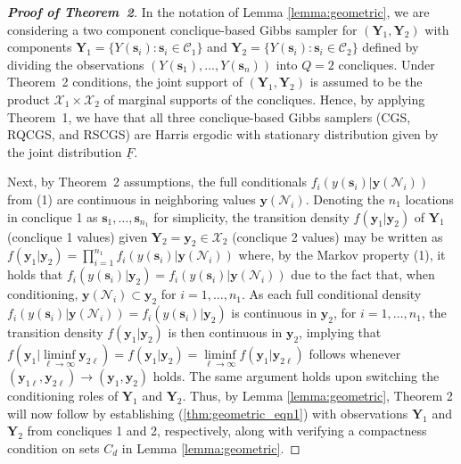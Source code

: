 \documentclass[12pt]{article}
\theoremstyle{definition}
\begin{document}
\begin{proof}[\bf Proof of Theorem~2]
  In the notation of Lemma \ref{lemma:geometric}, we are considering a two component conclique-based Gibbs sampler for $(\boldsymbol Y_1, \boldsymbol Y_2)$ with components $\boldsymbol Y_1 =\{Y(\boldsymbol s_i):\boldsymbol s_i \in \mathcal{C}_1\}$ and $\boldsymbol Y_2 =\{Y(\boldsymbol s_i):\boldsymbol s_i \in \mathcal{C}_2\}$ defined by dividing the observations $(Y(\boldsymbol s_1), \dots, Y(\boldsymbol s_n))$ into $Q = 2$ concliques.  Under Theorem~2 conditions, the joint support of
$(\boldsymbol Y_1,\boldsymbol Y_2)$ is assumed to be the product $\mathcal{X}_1\times \mathcal{X}_2$ of marginal supports of the concliques.
Hence, by applying Theorem~1,  we have that all three conclique-based Gibbs samplers (CGS, RQCGS, and RSCGS) are Harris ergodic with stationary distribution given by the joint distribution $\underline{F}$.


Next,  by Theorem~2 assumptions, the full conditionals $f_i(y(\boldsymbol s_i)|\boldsymbol y(\mathcal{N}_i))$ from (1) are continuous in neighboring values $\boldsymbol y(\mathcal{N}_i)$.  Denoting the $n_1$ locations in conclique 1 as  $\boldsymbol s_{1}, \dots, \boldsymbol s_{n_1}$ for simplicity, the transition density $f(\boldsymbol y_1|\boldsymbol y_2)$ of $\boldsymbol Y_1$ (conclique 1 values) given $\boldsymbol Y_2=\boldsymbol y_2 \in\mathcal{X}_2$ (conclique 2 values) may be written as $f(\boldsymbol y_1|\boldsymbol y_2) = \prod\limits_{i = 1}^{n_1} f_{i}(y(\boldsymbol s_{i})|\boldsymbol y(\mathcal{N}_{i}))$ where, by the Markov property (1), it holds that $f_{i}(y(\boldsymbol s_{i})|\boldsymbol y_2) = f_{i}(y(\boldsymbol s_{i})|\boldsymbol y(\mathcal{N}_{i}))$ due to the fact that, when conditioning, $\boldsymbol y(\mathcal{N}_{i}) \subset \boldsymbol y_2$ for $i = 1, \dots, n_1$.  As each full conditional density $f_{i}(y(\boldsymbol s_{i})|\boldsymbol y(\mathcal{N}_{i})) = f_{i}(y(\boldsymbol s_{i})|\boldsymbol y_2)$ is continuous in $\boldsymbol y_2$, for $i=1,\ldots,n_1$, the transition density $f(\boldsymbol y_1|\boldsymbol y_2)$ is then continuous in $\boldsymbol y_2$, implying that  $f\left(\boldsymbol y_1|\liminf\limits_{\ell \rightarrow \infty} \boldsymbol y_{2\ell} \right) = f(\boldsymbol y_1|\boldsymbol y_2) = \liminf\limits_{\ell \rightarrow \infty} f(\boldsymbol y_1|\boldsymbol y_{2\ell})$ follows whenever $(\boldsymbol y_{1\ell}, \boldsymbol y_{2\ell}) \rightarrow (\boldsymbol y_1, \boldsymbol y_2)$ holds. The same argument holds upon switching the conditioning roles of $\boldsymbol Y_1$ and $\boldsymbol Y_2$. Thus, by Lemma \ref{lemma:geometric}, Theorem 2 will now follow by establishing (\ref{thm:geometric_eqn1})   with observations $\boldsymbol Y_1$ and $\boldsymbol Y_2$ from concliques 1 and 2, respectively, along with verifying a
compactness condition on sets $C_d$ in Lemma \ref{lemma:geometric}.


\end{proof}
\end{document}
